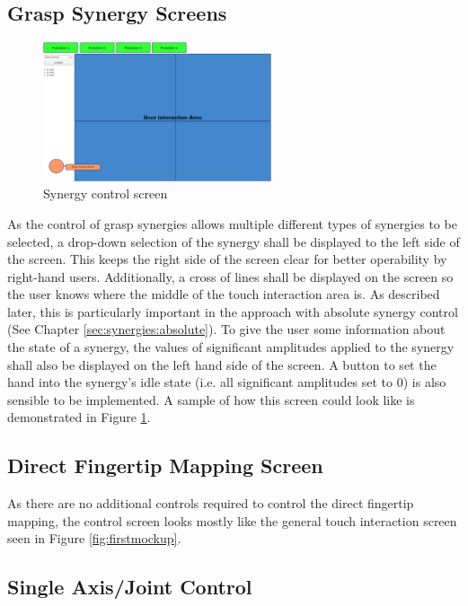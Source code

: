 \subsection{Grasp Synergy Screens}

\begin{figure}
	\caption{\label{fig:screen:synergy}Synergy control screen}
	\includegraphics[width=0.6\textwidth]{assets/chpt_concepts/grasp_synergy_page}
\end{figure}

As the control of grasp synergies allows multiple different types of synergies to be selected, a drop-down selection of the synergy shall be displayed to the left side of the screen. This keeps the right side of the screen clear for better operability by right-hand users. Additionally, a cross of lines shall be displayed on the screen so the user knows where the middle of the touch interaction area is. As described later, this is particularly important in the approach with absolute synergy control (See Chapter \ref{sec:synergies:absolute}). To give the user some information about the state of a synergy, the values of significant amplitudes applied to the synergy shall also be displayed on the left hand side of the screen. A button to set the hand into the synergy's idle state (i.e. all significant amplitudes set to $0$) is also sensible to be implemented. A sample of how this screen could look like is demonstrated in Figure \ref{fig:screen:synergy}.

\subsection{Direct Fingertip Mapping Screen}

As there are no additional controls required to control the direct fingertip mapping, the control screen looks mostly like the general touch interaction screen seen in Figure \ref{fig:firstmockup}.

\subsection{Single Axis/Joint Control}


